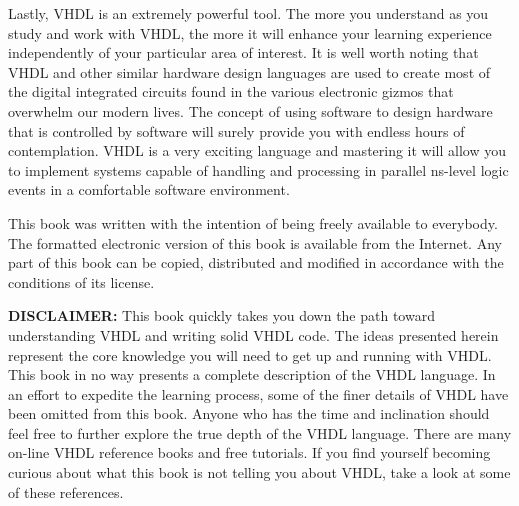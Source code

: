 Lastly, VHDL is an extremely powerful tool. The more you understand as you study and work with VHDL, the more it will enhance your learning experience independently of your particular area of interest. It is well worth noting that VHDL and other similar hardware design languages are used to create most of the digital integrated circuits found in the various electronic gizmos that overwhelm our modern lives. The concept of using software to design hardware that is controlled by software will surely provide you with endless hours of contemplation. VHDL is a very exciting language and mastering it will allow you to implement systems capable of handling and processing in parallel ns-level logic events in a comfortable software environment.

This book was written with the intention of being freely available to everybody. The formatted electronic version of this book is available from the Internet. Any part of this book can be copied, distributed and modified in accordance with the conditions of its license.
\vspace{10pt}

\noindent
\textbf{DISCLAIMER:}
This book quickly takes you down the path toward understanding VHDL and writing solid VHDL code. The ideas presented herein represent the core knowledge you will need to get up and running with VHDL. This book in no way presents a complete description of the VHDL language. In an effort to expedite the learning process, some of the finer details of VHDL have been omitted from this book. Anyone who has the time and inclination should feel free to further explore the true depth of the VHDL language. There are many on-line VHDL reference books and free tutorials. If you find yourself becoming curious about what this book is not telling you about VHDL, take a look at some of these references.
